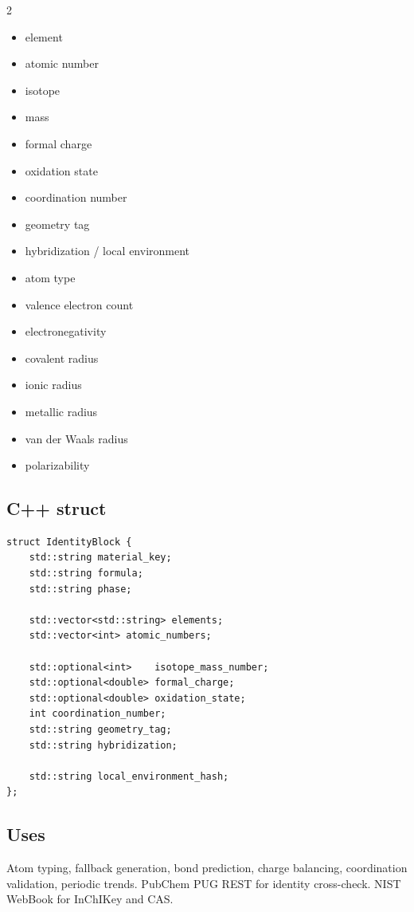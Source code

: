 \documentclass[11pt, a4paper]{article}
\begin{document}
\begin{multicols}{2}
\begin{itemize}[itemsep=1pt, leftmargin=*]
  \item element
  \item atomic number
  \item isotope
  \item mass
  \item formal charge
  \item oxidation state
  \item coordination number
  \item geometry tag
  \item hybridization / local environment
  \item atom type
  \item valence electron count
  \item electronegativity
  \item covalent radius
  \item ionic radius
  \item metallic radius
  \item van der Waals radius
  \item polarizability
\end{itemize}
\end{multicols}

\subsection{C++ struct}

\begin{lstlisting}
struct IdentityBlock {
    std::string material_key;
    std::string formula;
    std::string phase;

    std::vector<std::string> elements;
    std::vector<int> atomic_numbers;

    std::optional<int>    isotope_mass_number;
    std::optional<double> formal_charge;
    std::optional<double> oxidation_state;
    int coordination_number;
    std::string geometry_tag;
    std::string hybridization;

    std::string local_environment_hash;
};
\end{lstlisting}

\subsection{Uses}

Atom typing, fallback generation, bond prediction, charge balancing, coordination validation, periodic trends. PubChem PUG REST for identity cross-check. NIST WebBook for InChIKey and CAS.
\end{document}

